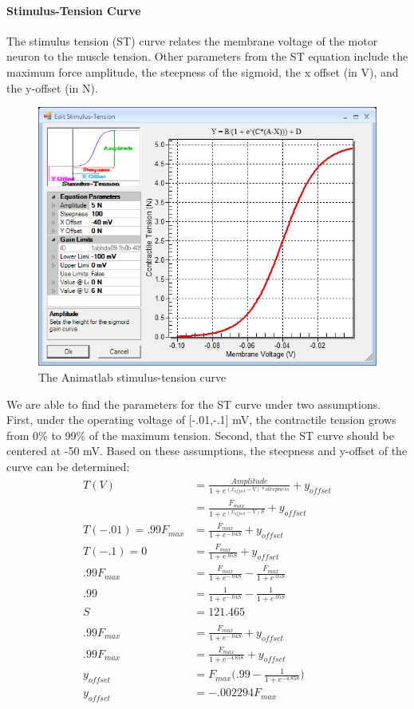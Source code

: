 \documentclass[runningheads,a4paper]{llncs}
\begin{document}
		\paragraph{Stimulus-Tension Curve}
			The stimulus tension (ST) curve relates the membrane voltage of the motor neuron to the muscle tension. Other parameters from the ST equation include the maximum force amplitude, the steepness of the sigmoid, the x offset (in V), and the y-offset (in N).
			\begin{figure}
				\centering
				\includegraphics[width=.8\textwidth]{Figures/st2.PNG}
				\caption{The Animatlab stimulus-tension curve}
				\label{fig:STanim}
			\end{figure}
			We are able to find the parameters for the ST curve under two assumptions. First, under the operating voltage of [-.01,-.1] mV, the contractile tension grows from 0\% to 99\% of the maximum tension. Second, that the ST curve should be centered at -50 mV. Based on these assumptions, the steepness and y-offset of the curve can be determined:
			\begin{align*}
				T(V) &= \frac{Amplitude}{1+e^{(x_{offset}-V)*steepness}}+y_{offset} \\
					 &= \frac{F_{max}}{1+e^{(x_{offset}-V)S}}+y_{offset} \\
				T(-.01) = .99F_{max} &= \frac{F_{max}}{1+e^{-.04S}}+y_{offset} \\
				T(-.1) = 0 &= \frac{F_{max}}{1+e^{.05S}}+y_{offset} \\
				.99F_{max} &= \frac{F_{max}}{1+e^{-.04S}} - \frac{F_{max}}{1+e^{.05S}} \\
				.99 &= \frac{1}{1+e^{-.04S}} - \frac{1}{1+e^{.05S}} \\
				S &= 121.465 \\
				\\
				.99F_{max} &= \frac{F_{max}}{1+e^{-.04S}}+y_{offset} \\
				.99F_{max} &= \frac{F_{max}}{1+e^{-4.858}}+y_{offset} \\
				y_{offset} &= F_{max}\bigg(.99-\frac{1}{1+e^{-4.858}}\bigg) \\
				y_{offset} &= -.002294 F_{max}
			\end{align*}
\end{document}

